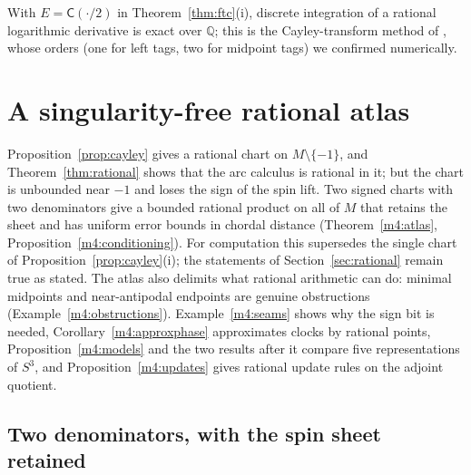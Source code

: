 \documentclass[11pt,reqno]{amsart}
\theoremstyle{definition}
\theoremstyle{remark}
\numberwithin{equation}{section}
\newcommand{\Q}{\mathbb{Q}}
\newcommand{\Cay}{\mathsf{C}}
\begin{document}
With $E=\Cay(\cdot/2)$ in Theorem~\ref{thm:ftc}(i), discrete integration of a rational logarithmic derivative is
exact over $\Q$; this is the Cayley-transform method of \cite{DLP,Iserles01}, whose orders (one for left tags,
two for midpoint tags) we confirmed numerically.

\setcounter{section}{0}
\renewcommand{\thesection}{10\Alph{section}}
\renewcommand{\theHsection}{arcC.\arabic{section}}
\section{A singularity-free rational atlas}\label{sec:m4atlas}

Proposition~\ref{prop:cayley} gives a rational chart on $M\setminus\{-1\}$, and Theorem~\ref{thm:rational} shows that the arc calculus
is rational in it; but the chart is unbounded near $-1$ and loses the sign of the spin lift.  Two signed charts with two denominators
give a bounded rational product on all of $M$ that retains the sheet and has uniform error bounds in chordal distance
(Theorem~\ref{m4:atlas}, Proposition~\ref{m4:conditioning}).  For computation this supersedes the single chart of
Proposition~\ref{prop:cayley}(i); the statements of Section~\ref{sec:rational} remain true as stated.  The atlas also delimits what
rational arithmetic can do: minimal midpoints and near-antipodal endpoints are genuine obstructions (Example~\ref{m4:obstructions}).
Example~\ref{m4:seams} shows why the sign bit is needed, Corollary~\ref{m4:approxphase} approximates clocks by rational points,
Proposition~\ref{m4:models} and the two results after it compare five representations of $S^3$, and Proposition~\ref{m4:updates}
gives rational update rules on the adjoint quotient.

\subsection{Two denominators, with the spin sheet retained}
\end{document}
